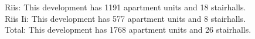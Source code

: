 {Riis}: This development has 1191 apartment units and 18 stairhalls.\\{Riis Ii}: This development has 577 apartment units and 8 stairhalls.\\{Total}: This development has 1768 apartment units and 26 stairhalls.\\